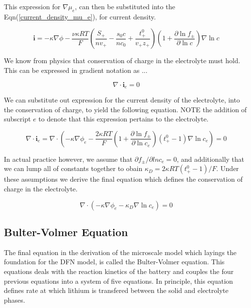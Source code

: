 \documentclass[lettersize,journal]{IEEEtran}
\begin{document}
\noindent This expression for $\nabla \mu_e$, can then be substituted into the Eqn(\ref{current_density_mu_e}), for current density.

\begin{equation}
\mathbf{i}=-\kappa \nabla \phi-\frac{\nu \kappa R T}{F}\left(\frac{S_{+}}{n v_{+}}-\frac{s_{0} c}{n c_{0}}+\frac{t_{+}^{0}}{v_{+} z_{+}}\right)\left(1+\frac{\partial \ln f_{\pm}}{\partial \ln c}\right) \nabla \ln c
\end{equation}

\noindent We know from physics that conservation of charge in the electrolyte must hold. This can be expressed in gradient notation as ...

\begin{equation}
  \nabla \cdot \mathbf{i}_e = 0
\end{equation}

\noindent We can substitute out expression for the current density of the electrolyte, into the conservation of charge, to yield the following equation. NOTE the addition of subscript $e$ to denote that this expression pertains to the electrolyte.

\begin{equation}
\nabla \cdot \mathbf{i}_{e}=\nabla \cdot\left(-\kappa \nabla \phi_{e}-\frac{2 \kappa R T}{F}\left(1+\frac{\partial \ln f_{\pm}}{\partial \ln c_{e}}\right)\left(t_{+}^{0}-1\right) \nabla \ln c_{e}\right)=0
\end{equation}

\noindent In actual practice however, we assume that $\partial{f_{\pm}}/\partial ln {c_e} = 0 $, and additionally that we can lump all of constants together to obain $\kappa_{D}=2 \kappa R T\left(t_{+}^{0}-1\right) / F$. Under these assumptions we derive the final equation which defines the conservation of charge in the electrolyte.

\begin{equation}
\nabla \cdot\left(-\kappa \nabla \phi_{e}-\kappa_{D} \nabla \ln c_{e}\right)=0
\end{equation}


\subsection{Bulter-Volmer Equation}
The final equation in the derivation of the microscale model which layings the foundation for the DFN model, is called the Bulter-Volmer equation. This equations deals with the reaction kinetics of the battery and couples the four previous equations into a system of five equations. In principle, this equation defines rate at which lithium is transfered between the solid and electrolyte phases.
\end{document}
